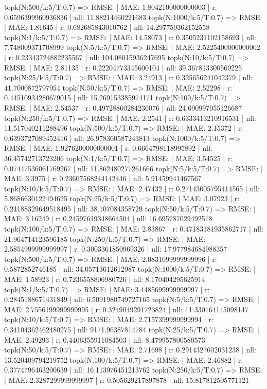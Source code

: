 topk(N:500/k:5/T:0.7) => RMSE: | MAE: 1.8042100000000003 | r: 0.6596399960936836 | nll: 11.88214460221683
topk(N:1000/k:5/T:0.7) => RMSE: | MAE: 1.81645 | r: 0.682685843010762 | nll: 14.297759362152558
topk(N:1/k:5/T:0.7) => RMSE: | MAE: 14.58073 | r: 0.3505231102158693 | nll: 7.748009371708999
topk(N:5/k:5/T:0.7) => RMSE: | MAE: 2.5225400000000002 | r: 0.23343724882235567 | nll: 104.08015936247695
topk(N:10/k:5/T:0.7) => RMSE: | MAE: 2.81135 | r: 0.22204773345600104 | nll: 39.367813300569225
topk(N:25/k:5/T:0.7) => RMSE: | MAE: 3.24913 | r: 0.325656241042379 | nll: 41.7000872797954
topk(N:50/k:5/T:0.7) => RMSE: | MAE: 2.52298 | r: 0.44510934280679015 | nll: 15.269153385974171
topk(N:100/k:5/T:0.7) => RMSE: | MAE: 2.54537 | r: 0.49728860284236076 | nll: 24.690997055126687
topk(N:250/k:5/T:0.7) => RMSE: | MAE: 2.2541 | r: 0.6333413210916531 | nll: 11.517040211288496
topk(N:500/k:5/T:0.7) => RMSE: | MAE: 2.15372 | r: 0.6393727089452416 | nll: 26.978360587243813
topk(N:1000/k:5/T:0.7) => RMSE: | MAE: 1.9276200000000001 | r: 0.6664798118995892 | nll: 36.45742713723206
topk(N:1/k:5/T:0.7) => RMSE: | MAE: 3.54525 | r: 0.07447536061769267 | nll: 11.862480277261666
topk(N:5/k:5/T:0.7) => RMSE: | MAE: 3.3975 | r: 0.23607568244142446 | nll: 5.91459941467567
topk(N:10/k:5/T:0.7) => RMSE: | MAE: 2.47432 | r: 0.27143005795414565 | nll: 5.8686630122494625
topk(N:25/k:5/T:0.7) => RMSE: | MAE: 3.07923 | r: 0.24188329649518495 | nll: 38.107084358729
topk(N:50/k:5/T:0.7) => RMSE: | MAE: 3.16249 | r: 0.24597619348664504 | nll: 16.695787029492518
topk(N:100/k:5/T:0.7) => RMSE: | MAE: 2.83867 | r: 0.47183181935862717 | nll: 21.964714123596185
topk(N:250/k:5/T:0.7) => RMSE: | MAE: 2.5854999999999997 | r: 0.3003361850969326 | nll: 17.977984684988357
topk(N:500/k:5/T:0.7) => RMSE: | MAE: 2.0831099999999996 | r: 0.5872852746185 | nll: 34.05713612612987
topk(N:1000/k:5/T:0.7) => RMSE: | MAE: 1.58923 | r: 0.7236558806980726 | nll: 8.170404295625914
topk(N:1/k:5/T:0.7) => RMSE: | MAE: 3.4485699999999997 | r: 0.2845188671431849 | nll: 6.5091980749727165
topk(N:5/k:5/T:0.7) => RMSE: | MAE: 2.7556199999999995 | r: 0.3249049291723824 | nll: 11.330164145098147
topk(N:10/k:5/T:0.7) => RMSE: | MAE: 2.7157399999999994 | r: 0.34104362462480275 | nll: 9171.96387814784
topk(N:25/k:5/T:0.7) => RMSE: | MAE: 2.49293 | r: 0.4406355911084503 | nll: 8.479957800580573
topk(N:50/k:5/T:0.7) => RMSE: | MAE: 2.71698 | r: 0.2914327602031238 | nll: 13.520409794219752
topk(N:100/k:5/T:0.7) => RMSE: | MAE: 2.46882 | r: 0.3774796463200639 | nll: 16.113976451213762
topk(N:250/k:5/T:0.7) => RMSE: | MAE: 2.3287299999999997 | r: 0.505629217897878 | nll: 15.817812505771121
